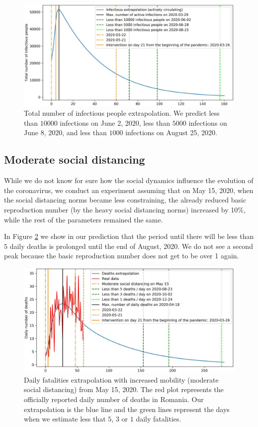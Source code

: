 \documentclass[11pt]{article}
\begin{document}
\newpage

\begin{figure}[H]
  \centering
  \includegraphics[width=0.8\linewidth]{figs/best_fit/2020-5-21_4_primary_wave-infectious.pdf}
  \caption{Total number of infectious people extrapolation. We predict less than $10000$ infections on June 2, 2020, less than $5000$ infections on June 8, 2020, and less than $1000$ infections on August 25, 2020.}
  \label{infectious-extrapolation}
\end{figure}

\subsection{Moderate social distancing}

While we do not know for sure how the social dynamics influence the evolution of the coronavirus, we conduct an experiment assuming that on May 15, 2020, when the social distancing norms became less constraining, the already reduced basic reproduction number (by the heavy social distancing norms) increased by 10\%, while the rest of the parameters remained the same.

In Figure \ref{deaths-extrapolation-second-wave} we show in our prediction that the period until there will be less than $5$ daily deaths is prolonged until the end of August, 2020. We do not see a second peak because the basic reproduction number does not get to be over 1 again.

\begin{figure}[H]
  \centering
  \includegraphics[width=0.8\linewidth]{figs/moderate/2020-5-21_4_secondary_wave-deaths_extrapolation.pdf}
  \caption{Daily fatalities extrapolation with increased mobility (moderate social distancing) from May 15, 2020. The red plot represents the officially reported daily number of deaths in Romania. Our extrapolation is the blue line and the green lines represent the days when we estimate less that $5$, $3$ or $1$ daily fatalities.}
  \label{deaths-extrapolation-second-wave}
\end{figure}
\end{document}
